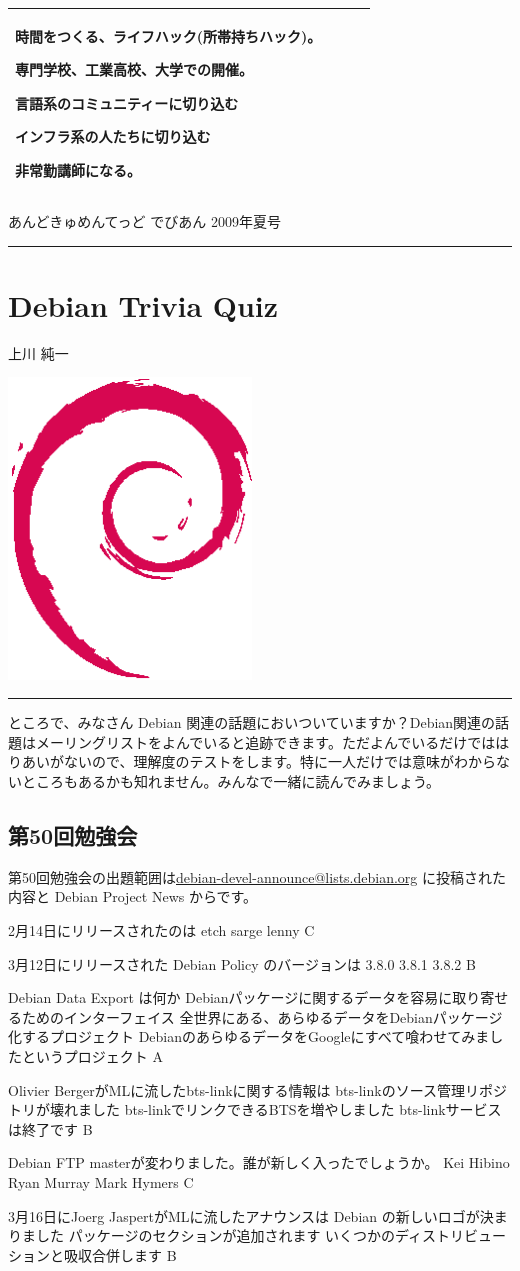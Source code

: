 \documentclass[mingoth,a4paper]{jsarticle}
\renewcommand{\dancersection}[2]{%
\newpage
あんどきゅめんてっど でびあん 2009年夏号
%
\vspace{0.1mm}\\
{\color{dancerlightblue}\rule{\hsize}{2mm}}

%
%
\begin{minipage}[t]{0.6\hsize}
\color{dancerdarkblue}
\vspace{1cm}
\section{#1}
\hfill{}#2\\
\end{minipage}
\begin{minipage}[t]{0.4\hsize}
\vspace{-2cm}
\hfill{}\includegraphics[height=8cm]{image200502/openlogo-nd.eps}\\
\vspace{-5cm}
\end{minipage}
%
%
{\color{dancerdarkblue}\rule{0.74\hsize}{2mm}}
%
\vspace{2cm}
}
\begin{document}
\begin{commandline}
\begin{tabular}[t]{|p{4em}|p{11em}|p{11em}|p{11em}|}
時間をつくる、ライフハック(所帯持ちハック)。

専門学校、工業高校、大学での開催。


言語系のコミュニティーに切り込む

インフラ系の人たちに切り込む

非常勤講師になる。

&

\\
\hline
\end{tabular}

\newpage

\dancersection{Debian Trivia Quiz}{上川 純一}

ところで、みなさん Debian 関連の話題においついていますか？Debian関連の話
題はメーリングリストをよんでいると追跡できます。ただよんでいるだけではは
りあいがないので、理解度のテストをします。特に一人だけでは意味がわからな
いところもあるかも知れません。みんなで一緒に読んでみましょう。

 \subsection{第50回勉強会}
第50回勉強会の出題範囲は\url{debian-devel-announce@lists.debian.org} に投稿された内容と Debian Project News からです。

 \santaku
 {2月14日にリリースされたのは}
 {etch}
 {sarge}
 {lenny}
 {C}

 \santaku
 {3月12日にリリースされた Debian Policy のバージョンは}
 {3.8.0}
 {3.8.1}
 {3.8.2}
 {B}

 \santaku
 {Debian Data Export は何か}
 {Debianパッケージに関するデータを容易に取り寄せるためのインターフェイス}
 {全世界にある、あらゆるデータをDebianパッケージ化するプロジェクト}
 {DebianのあらゆるデータをGoogleにすべて喰わせてみましたというプロジェクト}
 {A}

 \santaku
 {Olivier BergerがMLに流したbts-linkに関する情報は}
 {bts-linkのソース管理リポジトリが壊れました}
 {bts-linkでリンクできるBTSを増やしました}
 {bts-linkサービスは終了です}
 {B}

 \santaku
 {Debian FTP masterが変わりました。誰が新しく入ったでしょうか。}
 {Kei Hibino}
 {Ryan Murray}%
 {Mark Hymers}%
 {C}

 \santaku
 {3月16日にJoerg JaspertがMLに流したアナウンスは}
 {Debian の新しいロゴが決まりました}
 {パッケージのセクションが追加されます}
 {いくつかのディストリビューションと吸収合併します}
 {B}


\end{commandline}
\end{document}
